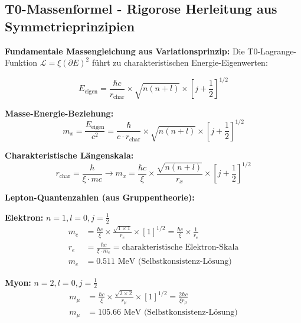 \documentclass[12pt,a4paper]{article}
\numberwithin{equation}{section}
\newcommand{\xipar}{\xi}
\newcommand{\calL}{\mathcal{L}}
\begin{document}
	\subsection{T0-Massenformel - Rigorose Herleitung aus Symmetrieprinzipien}
	
	\textbf{Fundamentale Massengleichung aus Variationsprinzip:}
	Die T0-Lagrange-Funktion $\calL = \xipar(\partial E)^2$ führt zu charakteristischen Energie-Eigenwerten:
	
	\begin{equation}
		E_{\text{eigen}} = \frac{\hbar c}{r_{\text{char}}} \times \sqrt{n(n+l)} \times [j+\frac{1}{2}]^{1/2}
		\label{eq:energy_eigenvalues}
	\end{equation}
	
	\textbf{Masse-Energie-Beziehung:}
	\begin{equation}
		m_x = \frac{E_{\text{eigen}}}{c^2} = \frac{\hbar}{c \cdot r_{\text{char}}} \times \sqrt{n(n+l)} \times [j+\frac{1}{2}]^{1/2}
		\label{eq:mass_energy}
	\end{equation}
	
	\textbf{Charakteristische Längenskala:}
	\begin{equation}
		r_{\text{char}} = \frac{\hbar}{\xipar \cdot mc} \rightarrow m_x = \frac{\hbar c}{\xipar} \times \frac{\sqrt{n(n+l)}}{r_x} \times [j+\frac{1}{2}]^{1/2}
		\label{eq:characteristic_length}
	\end{equation}
	
	\textbf{Lepton-Quantenzahlen (aus Gruppentheorie):}
	
	\textbf{Elektron:} $n=1, l=0, j=\frac{1}{2}$
	\begin{align}
		m_e &= \frac{\hbar c}{\xipar} \times \frac{\sqrt{1 \times 1}}{r_e} \times [1]^{1/2} = \frac{\hbar c}{\xipar} \times \frac{1}{r_e}\\
		r_e &= \frac{\hbar c}{\xipar \cdot m_e} = \text{charakteristische Elektron-Skala}\\
		m_e &= 0.511 \text{ MeV (Selbstkonsistenz-Lösung)}
		\label{eq:electron_mass}
	\end{align}
	
	\textbf{Myon:} $n=2, l=0, j=\frac{1}{2}$
	\begin{align}
		m_\mu &= \frac{\hbar c}{\xipar} \times \frac{\sqrt{2 \times 2}}{r_\mu} \times [1]^{1/2} = \frac{2\hbar c}{\xipar r_\mu}\\
		m_\mu &= 105.66 \text{ MeV (Selbstkonsistenz-Lösung)}
		\label{eq:muon_mass}
	\end{align}
	
\end{document}
